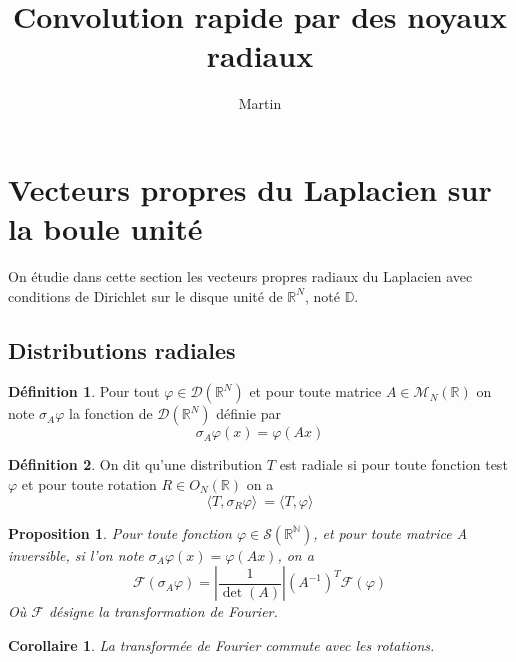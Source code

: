 \documentclass[11pt,a4paper]{article}
\title{Convolution rapide par des noyaux radiaux}
\author{Martin}
\begin{document}
\renewcommand{\proofname}{Preuve}
\maketitle
\theoremstyle{plain}
\newtheorem{The}{Théorème}[section]
\newtheorem{Prop}{Proposition}[section]
\newtheorem{Cor}{Corollaire}[section]
\newtheorem{Lem}{Lemme}[section]
\theoremstyle{definition}
\newtheorem{Def}{Définition}[section]
\newtheorem{Rem}{Remarque}[section]
\newcommand{\enstq}[2]{\left\{#1\mathrel{}\middle|\mathrel{}#2\right\}}
\newcommand{\Lp}[2]{L^#1(#2)}
\newcommand{\Sob}[3]{W^{#1,#2}(#3)}
\newcommand{\RN}[0]{\mathbb{R}^N}
\newcommand{\norm}[1]{\left\|#1\right\|}
\newcommand{\sinc}[0]{\textup{sinc}}
\newcommand{\functionDef}[5]{\begin{array}{lllll}
#1 & : & #2 & \longrightarrow & #3 \\
 & & #4 & \longmapsto &\displaystyle #5 \\
\end{array}}
\newcommand{\N}{\mathbb{N}}
\newcommand{\D}{\mathbb{D}}
\newcommand{\A}{\mathcal{A}_{a,b}}
\newcommand{\Crad}{C^\infty_{rad}(\D)}
\newcommand{\Lrad}{L^2_{rad}(\D)}
\newcommand{\Lradab}{L^2_{rad}(\mathcal{A}_{a,b})}
\newcommand{\duality}[2]{\left\langle #1,#2\right\rangle}
\newcommand{\Hrad}{H^1_{rad}(\D)}
\newcommand{\Hzrad}{H^1_{0,rad}(\D)}

\section{Vecteurs propres du Laplacien sur la boule unité}

On étudie dans cette section les vecteurs propres radiaux du Laplacien avec conditions de Dirichlet sur le disque unité de $\mathbb{R}^N$, noté $\D$. 


\subsection{Distributions radiales}


\begin{Def} Pour tout $\varphi\in \mathcal{D}(\mathbb{R}^N)$ et pour toute matrice $A \in \mathcal{M}_N(\mathbb{R})$ on note $\sigma_A\varphi$ la fonction de $\mathcal{D}(\mathbb{R}^N)$ définie par \[\sigma_A\varphi(x) = \varphi(Ax)\]
\end{Def}
\begin{Def} On dit qu'une distribution $T$ est radiale si pour toute fonction test $\varphi$ et pour toute rotation $R \in O_N(\mathbb{R})$ on a \[\langle
T,\sigma_R\varphi\rangle\ = \langle T, \varphi\rangle\]  
\end{Def}
\begin{Prop} Pour toute fonction $\varphi \in \mathcal{S}(\mathbb{R^N})$, et pour toute matrice A inversible, si l'on note $\sigma_A\varphi(x) = \varphi(Ax)$, on a \[\mathcal{F}(\sigma_A\varphi) = \left|\dfrac{1}{\det(A)}\right|\left(A^{-1}\right)^T\mathcal{F}(\varphi)\] Où $\mathcal{F} $ désigne la transformation de Fourier. 
\end{Prop}
\begin{Cor} La transformée de Fourier commute avec les rotations. 
\end{Cor}
\end{document}

